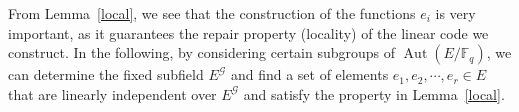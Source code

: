 \documentclass[journal,12pt,onecolumn]{IEEEtran}
\newtheorem{lemma}{Lemma}
\begin{document}

From Lemma~\ref{local}, we see that the construction of the functions \( e_i \) is very important, as it guarantees the repair property (locality) of the linear code we construct. In the following, by considering certain subgroups of $\operatorname{Aut}(E/\mathbb{F}_q)$, we can determine the fixed subfield $E^{\mathcal{G}}$ and find a set of elements $e_1, e_2, \cdots, e_r \in E$ that are linearly independent over $E^{\mathcal{G}}$ and satisfy the property in Lemma~\ref{local}. 
\end{document}

